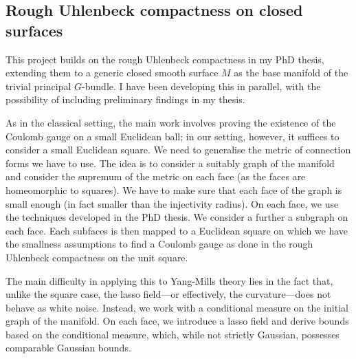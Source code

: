 \documentclass[12pt]{article}
\numberwithin{equation}{section}
\theoremstyle{definition}
\theoremstyle{remark}
\newcommand{\1}{\mathbf 1}
\newcommand{\<}{\langle}
\renewcommand{\>}{\rangle}
\begin{document}


\subsection{Rough Uhlenbeck compactness on closed surfaces}
%
This project builds on the rough Uhlenbeck compactness in my PhD thesis, extending them to a generic closed smooth surface $M$ as the base manifold of the trivial principal $G$-bundle. I have been developing this in parallel, with the possibility of including preliminary findings in my thesis.
%
%

As in the classical setting, the main work involves proving the existence of the Coulomb gauge on a small Euclidean ball; in our setting, however, it suffices to consider a small Euclidean square. We need to generalise the metric of connection forms we have to use. The idea is to consider a suitably graph of the manifold and consider the supremum of the metric on each face (as the faces are homeomorphic to squares). We have to make sure that each face of the graph is small enough (in fact smaller than the injectivity radius). On each face, we use the techniques developed in the PhD thesis. We consider a further a subgraph on each face. Each subfaces is then mapped to a Euclidean square on which we have the smallness assumptions to find a Coulomb gauge as done in the rough Uhlenbeck compactness on the unit square. 

The main difficulty in applying this to Yang-Mills theory lies in the fact that, unlike the square case, the lasso field—or effectively, the curvature—does not behave as white noise. Instead, we work with a conditional measure on the initial graph of the manifold. On each face, we introduce a lasso field and derive bounds based on the conditional measure, which, while not strictly Gaussian, possesses comparable Gaussian bounds.
%
\end{document}
